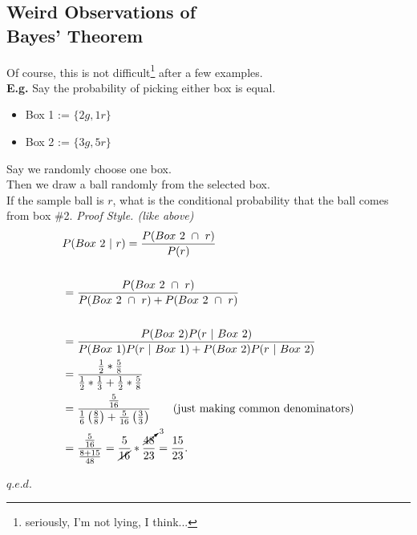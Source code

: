 \documentclass[12pt]{book}
\begin{document}
\subsection{Weird Observations of\\ Bayes' Theorem}
Of course, this is not difficult\footnote{seriously, I'm not lying, I think...} after a few examples.\\
\textbf{E.g.} Say the probability of picking either box is equal.
\begin{itemize}
\item Box 1 := $\{2g,1r\}$\\
\item Box 2 := $\{3g,5r\}$\\
\end{itemize}
\noindent Say we randomly choose one box.\\
Then we draw a ball randomly from the selected box.\\
If the sample ball is $r$, what is the conditional probability 
that the ball comes from box \#2.
\newpage
\noindent \textit{Proof Style. (like above)}\\
\begin{align*}
&P(Box~2~|~r)=\dfrac{P(Box~2~\cap~r)}{P(r)} \\\\
&=\dfrac{P(Box~2~\cap~r)}{P(Box~2~\cap~r)+P(Box~2~\cap~r)} \\\\
&=\dfrac{P(Box~2)P(r~|~Box~2)}{P(Box~1)P(r~|~Box~1)+P(Box~2)P(r~|~Box~2)}\\
&=\dfrac{\frac{1}{2}* \frac{5}{8}}{\frac{1}{2} * \frac{1}{3} + \frac{1}{2} * \frac{5}{8}}\\
&=\dfrac{\frac{5}{16}}{\frac{1}{6}\left(\frac{8}{8}\right) + \frac{5}{16}\left(\frac{3}{3}\right)}\tag{just making common denominators}\\
&=\dfrac{\frac{5}{16}}{\frac{8+15}{48}}=\frac{5}{\cancel{16}}* \dfrac{\cancelto{3}{48}}{23}=\dfrac{15}{23}.
\end{align*}

\hfill $q.e.d.$\\
\end{document}
